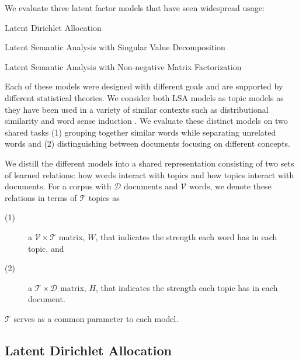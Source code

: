 \label{sec:topic-models}

We evaluate three latent factor models that have seen widespread usage:
\begin{enumerate*}
{\small
  \item Latent Dirichlet Allocation
  \item Latent Semantic Analysis with Singular Value Decomposition
  \item Latent Semantic Analysis with Non-negative Matrix Factorization
}
\end{enumerate*}

Each of these models were designed with different goals and are supported
by different statistical theories.  We consider both LSA models as topic models
as they have been used in a variety of similar contexts such as distributional
similarity \cite{jurgens10sspace} and word sense induction
\cite{vandeCruys11latentWsi,brody09ldawsi}.  We evaluate these distinct models
on two shared tasks (1) grouping together similar words while separating
unrelated words and (2) distinguishing between documents focusing on different
concepts.

We distill the different models into a shared representation consisting of two
sets of learned relations: how words interact with topics and how topics
interact with documents.  For a corpus with $\mathcal{D}$ documents and
$\mathcal{V}$ words, we denote these relations in terms of $\mathcal{T}$ topics
as
\begin{description}
\item[(1)] a $\mathcal{V} \times \mathcal{T}$ matrix, $W$, that indicates the strength
each word has in each topic, and
\item[(2)] a $\mathcal{T} \times \mathcal{D}$ matrix, $H$, that indicates the strength each topic
has in each document.  

\end{description}
$\mathcal{T}$ serves as a common parameter to each model.

\subsection{Latent Dirichlet Allocation}

